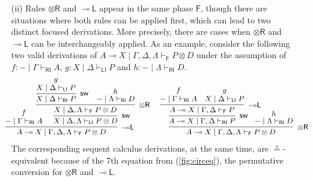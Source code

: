 \documentclass[copyright,creativecommons]{eptcs}
\theoremstyle{definition}
\newcommand{\tr}{\otimes \mathsf{R}}
\newcommand{\lleft}{{\multimap}\mathsf{L}}
\newcommand{\ot}{\otimes}
\newcommand{\lolli}{\multimap}
\newcommand{\RI}{\mathsf{RI}}
\newcommand{\LI}{\mathsf{LI}}
\newcommand{\F}{\mathsf{F}}
\newcommand{\proofbox}[1]{\begin{tabular}{l} #1 \end{tabular}}
\begin{document}
\begin{enumerate}
  \item[(ii)] Rules $\tr$ and $\lleft$ appear in the same phase $\F$, though there are situations where both rules can be applied first, which can lead to two distinct focused derivations. More precisely, there are cases when $\tr$ and $\lleft$ can be interchangeably applied. As an example, consider the following two valid derivations of $A \lolli X \mid \Gamma , \Delta , \Lambda \vdash_{\F} P \ot D$ under the assumption of $f : {-} \mid \Gamma \vdash_{\RI} A$, $g : X \mid \Delta \vdash_{\LI} P$ and $h : {-} \mid \Lambda \vdash_{\RI} D$.
    \begin{equation}\label{eq:llefttr}
\small
      \hspace{-.5cm}
      \proofbox{
      \infer[\lleft]{A \lolli X \mid \Gamma , \Delta , \Lambda \vdash_{\F} P \ot D}{
        \deduce{{-} \mid \Gamma \vdash_{\RI} A}{f}
        &\hspace{-.6cm}
        \infer[\mathsf{sw}]{X \mid \Delta , \Lambda \vdash_{\LI} P \ot D}{
          \infer[\tr]{X \mid \Delta , \Lambda \vdash_{\F} P\ot D}{
            \infer[\mathsf{sw}]{X \mid \Delta \vdash_{\RI} P}{
              \deduce{X \mid \Delta \vdash_{\LI} P}{g}
            }
            &
            \deduce{{-} \mid \Lambda \vdash_{\RI} D}{h}
          }
        }
      }
      \hspace{.2cm}
      \infer[\tr]{A \lolli X \mid \Gamma , \Delta , \Lambda \vdash_{\F} P \ot D}{
        \infer[\mathsf{sw}]{A \lolli X \mid \Gamma , \Delta \vdash_{\RI} P}{
          \infer[\lleft]{A \lolli X \mid \Gamma , \Delta \vdash_{\F} P}{
            \deduce{{-} \mid \Gamma \vdash_{\RI} A}{f}
            &
            \deduce{X \mid \Delta \vdash_{\LI} P}{g}
          }
        }
        &\hspace{-.6cm}
        \deduce{{-} \mid \Lambda \vdash_{\RI} D}{h}
      }
    }
    \end{equation}
    The corresponding sequent calculus derivations, at the same time, are $\circeq$-equivalent because of the 7th equation from (\ref{fig:circeq}), the permutative conversion for $\tr$ and $\lleft$.
\end{enumerate}
\end{document}
